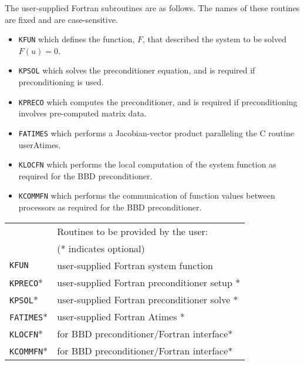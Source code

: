 \documentclass[11pt]{article}
\begin{document}
The user-supplied Fortran subroutines are as follows.  The names of
these routines are fixed and are case-sensitive.

\begin{itemize}
\item  {\tt KFUN} which defines the function, $F$, that described the system
to be solved  $F(u) = 0$.

\item  {\tt KPSOL} which solves the preconditioner equation, and is required
if preconditioning is used.

\item  {\tt KPRECO} which computes the preconditioner, and is required if
preconditioning involves pre-computed matrix data.

\item {\tt FATIMES} which performs a Jacobian-vector product paralleling the
C routine userAtimes.

\item {\tt KLOCFN} which performs the local computation of the system function
as required for the BBD preconditioner.

\item {\tt KCOMMFN} which performs the communication of function values between
processors as
required for the BBD preconditioner.

\end{itemize}

\begin{table}[htb]
\begin{center}
\begin{tabular}{|l|l|} \hline
  &Routines to be provided by the user: \\ 
  &   (* indicates optional) \\ \hline \hline
{\tt KFUN} & user-supplied Fortran system function \\ \hline
{\tt KPRECO}* & user-supplied Fortran preconditioner setup * \\ \hline
{\tt KPSOL}* & user-supplied Fortran preconditioner solve * \\ \hline
{\tt FATIMES}* & user-supplied Fortran Atimes * \\ \hline
{\tt KLOCFN}* & for BBD preconditioner/Fortran interface* \\ \hline
{\tt KCOMMFN}* & for BBD preconditioner/Fortran interface* \\ \hline
\end{tabular}
\end{center}
\end{table}
\end{document}

